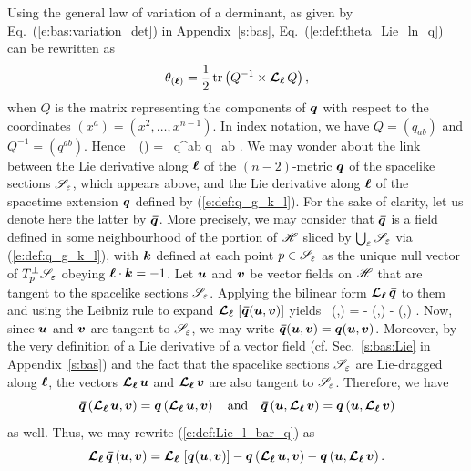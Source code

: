 Using the general law of variation of a derminant, as given by Eq.~(\ref{e:bas:variation_det})
in Appendix~\ref{s:bas}, Eq.~(\ref{e:def:theta_Lie_ln_q}) can be rewritten as
\[
    \theta_{(\bm{\ell})} = \frac{1}{2} \, \mathrm{tr} \left(Q^{-1} \times \bm{\mathcal{L}}_{\bm{\ell}}\, Q \right) ,
\]
when $Q$ is the matrix representing the components of $\bm{q}$ with respect to the
coordinates $(x^a) = (x^2,\ldots, x^{n-1})$. In index notation, we have
$Q = (q_{ab})$ and $Q^{-1} = (q^{ab})$. Hence
\be \label{e:def:theta_q_ab}
    \theta_{(\wl)} =  \, q^{ab} \Liec{\el} q_{ab} .
\ee
We may wonder about the link between the Lie derivative along $\bm{\ell}$ of the $(n-2)$-metric
$\bm{q}$ of the spacelike sections $\mathscr{S}_\varepsilon$, which appears above, and
the Lie derivative along $\bm{\ell}$ of the spacetime extension $\bm{q}$ defined by
(\ref{e:def:q_g_k_l}). For the sake of clarity, let us denote here the latter
by $\bm{\bar q}$. More precisely, we may consider that $\bm{\bar q}$ is a
field defined in some neighbourhood of the portion of $\mathscr{H}$ sliced by
$\bigcup_{\varepsilon} \mathscr{S}_\varepsilon$ via (\ref{e:def:q_g_k_l}), with $\bm{k}$
defined at each point $p\in\mathscr{S}_\varepsilon$ as the unique null vector of
$T_p^\perp\mathscr{S}_\varepsilon$ obeying $\bm{\ell}\cdot\bm{k}=-1$.
Let $\bm{u}$ and $\bm{v}$ be vector fields on $\mathscr{H}$ that are tangent
to the spacelike sections $\mathscr{S}_\varepsilon$. Applying the bilinear form
$\bm{\mathcal{L}}_{\bm{\ell}}\,\bm{\bar q}$ to them and using the Leibniz rule to expand
$\bm{\mathcal{L}}_{\bm{\ell}}\, \left[ \bm{\bar q}(\bm{u},\bm{v}) \right]$ yields
\be \label{e:def:Lie_l_bar_q}
     \Lie{\el}  \, (,) = \Lie{\el} 
        - \left(\Lie{\el},\right)
         - \left(,\Lie{\el}\right) .
\ee
Now, since $\bm{u}$ and $\bm{v}$ are tangent to $\mathscr{S}_\varepsilon$, we may
write $\bm{\bar q}(\bm{u},\bm{v}) = \bm{q}(\bm{u},\bm{v})$. Moreover, by the very
definition of a Lie derivative of a vector field (cf. Sec.~\ref{s:bas:Lie}
in Appendix~\ref{s:bas}) and the fact that the spacelike sections
$\mathscr{S}_\varepsilon$ are Lie-dragged along $\bm{\ell}$, the vectors
$\bm{\mathcal{L}}_{\bm{\ell}}\,\bm{u}$ and $\bm{\mathcal{L}}_{\bm{\ell}}\,\bm{v}$ are also tangent to $\mathscr{S}_\varepsilon$.
Therefore, we have
\[
    \bm{\bar q}\left(\bm{\mathcal{L}}_{\bm{\ell}}\,\bm{u},\bm{v}\right) = \bm{q} \left(\bm{\mathcal{L}}_{\bm{\ell}}\,\bm{u},\bm{v}\right)
    \quad\mbox{and}\quad
    \bm{\bar q}\left(\bm{u},\bm{\mathcal{L}}_{\bm{\ell}}\,\bm{v}\right) = \bm{q}\left(\bm{u},\bm{\mathcal{L}}_{\bm{\ell}}\,\bm{v}\right)
\]
as well. Thus, we may rewrite (\ref{e:def:Lie_l_bar_q}) as
\[
     \bm{\mathcal{L}}_{\bm{\ell}}\, \bm{\bar q} \, (\bm{u},\bm{v}) = \bm{\mathcal{L}}_{\bm{\ell}}\, \left[ \bm{q}(\bm{u},\bm{v}) \right]
        - \bm{q}\left(\bm{\mathcal{L}}_{\bm{\ell}}\,\bm{u},\bm{v}\right)
         - \bm{q}\left(\bm{u},\bm{\mathcal{L}}_{\bm{\ell}}\,\bm{v}\right) .
\]
